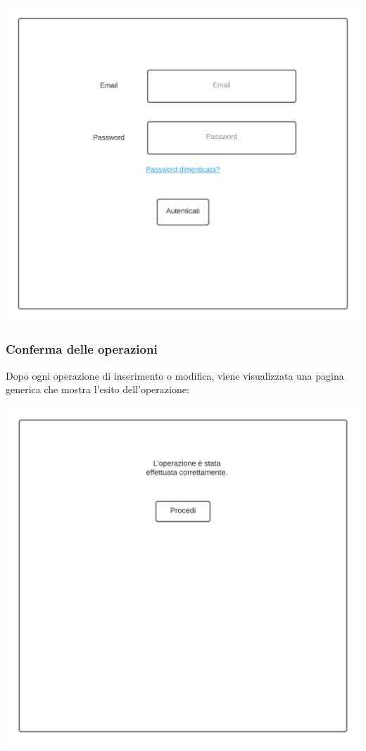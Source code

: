 \documentclass[12pt]{article}
\begin{document}
\begin{center}
\includegraphics[height=0.3\textheight]{Mockup/Autenticazione}
\end{center}


\newpage

\subsubsection{Conferma delle operazioni}
Dopo ogni operazione di inserimento o modifica, viene visualizzata una pagina generica che mostra l'esito dell'operazione:

\begin{center}
\includegraphics[height=0.3\textheight]{Mockup/Conferma}
\end{center}
\end{document}

